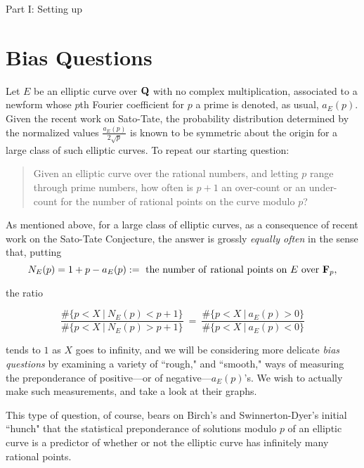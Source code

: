 \documentclass[11pt]{article}
\theoremstyle{plain}
\theoremstyle{definition}
\numberwithin{equation}{section}
\numberwithin{figure}{section}
\numberwithin{table}{section}
\def\Q{\bf{Q}}
\begin{document}
\vskip20pt
 \centerline{ \Large{ Part I: Setting up}}
  \vskip30pt
 \section{Bias Questions} Let $E$ be an elliptic curve over ${\Q}$  with no complex multiplication, associated to a newform whose $p$th Fourier coefficient for $p$ a prime is denoted, as usual, $a_E(p)$. Given the recent work \cite{} on Sato-Tate, the probability distribution determined by  the normalized values   ${\frac{a_E(p)}{2{\sqrt {p}}}}$  is known to be symmetric about the origin for a large class of such elliptic curves. To repeat our starting question:

\begin{quote} Given an elliptic curve over the rational numbers, and letting  $p$ range through prime numbers, how often is $p+1$  an over-count or an under-count for the number of rational points on the curve modulo $p$?  \end{quote}



  As mentioned above,  for a large class of elliptic curves, as a consequence of recent work on the Sato-Tate Conjecture, the answer is grossly  {\it equally often} in the sense that, putting $$N_E(p)=1+p-a_E(p):=\ {\rm the \ number\ of \ rational\ points \ on\ } E\ {\rm over}\  {\bf F}_p,$$

  the ratio

 $${\frac{\#\{p < X \ | \ N_E(p) < p+1 \}} {\#\{p < X \ | \ N_E(p) > p+1 \}}}\ =\ {\frac{\#\{p < X \ | \ a_E(p) > 0 \}} {\#\{p < X \ | \ a_E(p) < 0 \}}}$$

 tends to $1$ as $X$ goes to infinity, and we will be considering more delicate {\it bias questions} by examining a variety of ``rough," and ``smooth," ways of measuring  the preponderance of positive---or of negative---$a_E(p)$'s. We wish to actually make such measurements, and take a look at their graphs.


 This type of question, of course, bears on Birch's and  Swinnerton-Dyer's initial ``hunch" that the  statistical preponderance of solutions modulo $p$ of an elliptic curve is a predictor of whether or not the elliptic curve has infinitely many rational points.
\end{document}
